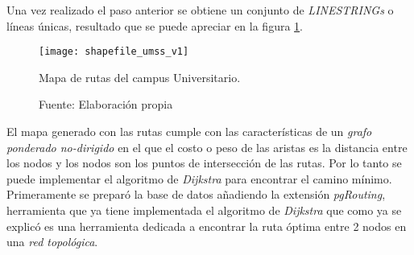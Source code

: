 Una vez realizado el paso anterior se obtiene un conjunto de \emph{LINESTRINGs} o líneas únicas, resultado que se puede apreciar en la figura \ref{fig:shapefile_umss_v1}. \\






\begin{figure}[H]
  \begin{center}
    \texttt{[image: shapefile\_umss\_v1]}
    \caption{Mapa de rutas del campus Universitario.}
    \label{fig:shapefile_umss_v1}
    \caption*{Fuente: Elaboración propia}
  \end{center}
\end{figure}


El mapa generado con las rutas cumple con las características de un \emph{grafo ponderado no-dirigido} en el que el costo o peso de las aristas es la distancia entre los nodos y los nodos son los puntos de intersección de las rutas. Por lo tanto se puede implementar el algoritmo de \emph{Dijkstra} para encontrar el camino mínimo. \\

Primeramente se preparó la base de datos añadiendo la extensión \emph{pgRouting}, herramienta que ya tiene implementada el algoritmo de \emph{Dijkstra} que como ya se explicó es una herramienta dedicada a encontrar la ruta óptima entre 2 nodos en una \emph{red topológica}.\\

%


